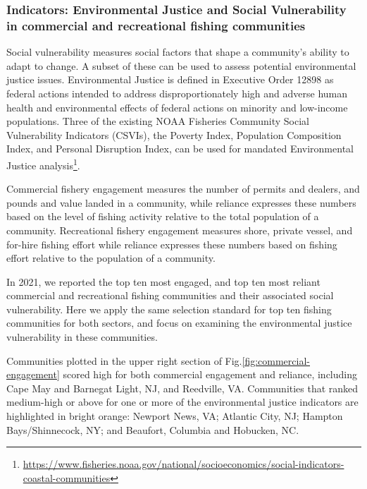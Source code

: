 \documentclass[
  10pt,
]{article}
\begin{document}
\hypertarget{indicators-environmental-justice-and-social-vulnerability-in-commercial-and-recreational-fishing-communities}{%
\subsubsection{Indicators: Environmental Justice and Social
Vulnerability in commercial and recreational fishing
communities}\label{indicators-environmental-justice-and-social-vulnerability-in-commercial-and-recreational-fishing-communities}}

Social vulnerability measures social factors that shape a community's
ability to adapt to change. A subset of these can be used to assess
potential environmental justice issues. Environmental Justice is defined
in Executive Order 12898 as federal actions intended to address
disproportionately high and adverse human health and environmental
effects of federal actions on minority and low-income populations. Three
of the existing NOAA Fisheries Community Social Vulnerability Indicators
(CSVIs), the Poverty Index, Population Composition Index, and Personal
Disruption Index, can be used for mandated Environmental Justice
analysis\footnote{\url{https://www.fisheries.noaa.gov/national/socioeconomics/social-indicators-coastal-communities}}.

Commercial fishery engagement measures the number of permits and
dealers, and pounds and value landed in a community, while reliance
expresses these numbers based on the level of fishing activity relative
to the total population of a community. Recreational fishery engagement
measures shore, private vessel, and for-hire fishing effort while
reliance expresses these numbers based on fishing effort relative to the
population of a community.

In 2021, we reported the top ten most engaged, and top ten most reliant
commercial and recreational fishing communities and their associated
social vulnerability. Here we apply the same selection standard for top
ten fishing communities for both sectors, and focus on examining the
environmental justice vulnerability in these communities.

Communities plotted in the upper right section of
Fig.\ref{fig:commercial-engagement} scored high for both commercial
engagement and reliance, including Cape May and Barnegat Light, NJ, and
Reedville, VA. Communities that ranked medium-high or above for one or
more of the environmental justice indicators are highlighted in bright
orange: Newport News, VA; Atlantic City, NJ; Hampton Bays/Shinnecock,
NY; and Beaufort, Columbia and Hobucken, NC.
\end{document}
